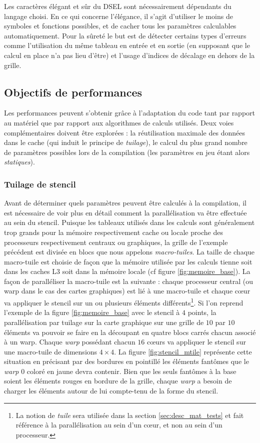 Les caractères élégant et sûr du DSEL sont nécessairement dépendants du langage choisi. En ce qui concerne l'élégance, il s'agit d'utiliser le moins de symboles et fonctions possibles, et de cacher tous les paramètres calculables automatiquement. Pour la sûreté le but est de détecter certains types d'erreurs comme l'utilisation du même tableau en entrée et en sortie (en supposant que le calcul en place n'a pas lieu d'être) et l'usage d'indices de décalage en dehors de la grille.

\subsection{Objectifs de performances}
\label{sec:obj_perf}

Les performances peuvent s'obtenir grâce à l'adaptation du code tant par rapport au matériel que par rapport aux algorithmes de calculs utilisés. Deux voies complémentaires doivent être explorées : la réutilisation maximale des données dans le cache (qui induit le principe de \emph{tuilage}), le calcul du plus grand nombre de paramètres possibles lors de la compilation (les paramètres en jeu étant alors \emph{statiques}).

\subsubsection*{Tuilage de stencil} 

Avant de déterminer quels paramètres peuvent être calculés à la compilation, il est nécessaire de voir plus en détail comment la parallélisation va être effectuée au sein du stencil. Puisque les tableaux utilisés dans les calculs sont généralement trop grands pour la mémoire respectivement cache ou locale proche des processeurs respectivement centraux ou graphiques, la grille de l'exemple précédent est divisée en blocs que nous appelons \emph{macro-tuiles}. La taille de chaque macro-tuile est choisie de façon que la mémoire utilisée par les calculs tienne soit dans les caches L3 soit dans la mémoire locale (cf figure \ref{fig:memoire_base}). La façon de paralléliser la macro-tuile est la suivante : chaque processeur central (ou warp dans le cas des cartes graphiques) est lié à une macro-tuile et chaque cœur va appliquer le stencil sur un ou plusieurs éléments différents\footnote{La notion de \emph{tuile} sera utilisée dans la section \ref{sec:desc_mat_tests} et fait référence à la parallélisation au sein d'un cœur, et non au sein d'un processeur.}. Si l'on reprend l'exemple de la figure \ref{fig:memoire_base} avec le stencil à $4$ points, la parallélisation par tuilage sur la carte graphique sur une grille de $10$ par $10$ éléments va pouvoir se faire en la découpant en quatre blocs carrés chacun associé à un warp. Chaque \emph{warp} possédant chacun $16$ cœurs va appliquer le stencil sur une macro-tuile de dimensions $4 \times 4$. La figure \ref{fig:stencil_mtile} représente cette situation en précisant par des bordures en pointillé les éléments fantômes que le \emph{warp} $0$ coloré en jaune devra contenir. Bien que les seuls fantômes à la base soient les éléments rouges en bordure de la grille, chaque \emph{warp} a besoin de charger les éléments autour de lui compte-tenu de la forme du stencil.

